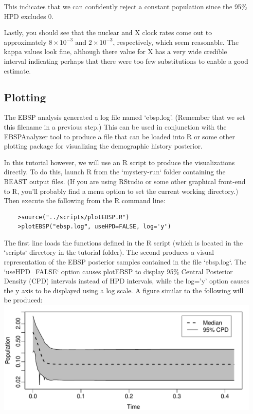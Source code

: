 \documentclass[a4paper,11pt]{article}
\begin{document}
This indicates that we can confidently reject a constant population since the
95\% HPD excludes 0.

Lastly, you should see that the nuclear and X clock rates come out to
approximately $8\times 10^{-3}$ and $2\times 10^{-3}$, respectively, which seem
reasonable.  The kappa values look fine, although there value for X has a very
wide credible interval indicating perhaps that there were too few substitutions
to enable a good estimate.

\subsection{Plotting}

The EBSP analysis generated a log file named `ebsp.log'.  (Remember that we set
this filename in a previous step.)  This can be used in conjunction with the
EBSPAnalyzer tool to produce a file that can be loaded into R or some other
plotting package for visualizing the demographic history posterior.

In this tutorial however, we will use an R script to produce the visualizations
directly. To do this, launch R from the `mystery-run` folder containing the
BEAST output files. (If you are using RStudio or some other graphical front-end
to R, you'll probably find a menu option to set the current working directory.)
Then execute the following from the R command line:

\begin{verbatim}
    >source("../scripts/plotEBSP.R")
    >plotEBSP("ebsp.log", useHPD=FALSE, log='y')
\end{verbatim}

The first line loads the functions defined in the R script (which is located in
the `scripts` directory in the tutorial folder). The second produces a visual
representation of the EBSP posterior samples contained in the file `ebsp.log`.
The `useHPD=FALSE` option causes plotEBSP to display 95\% Central Posterior
Density (CPD) intervals instead of HPD intervals, while the log='y' option
causes the y axis to be displayed using a log scale.  A figure similar to the
following will be produced:\\
\includegraphics[width=\textwidth]{figures/mystery1.pdf}
\end{document}
